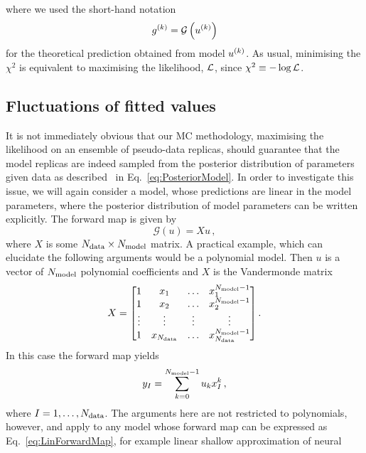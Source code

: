 where we used the short-hand notation
\begin{equation}
    g^{(k)} = \mathcal{G}\left(u^{(k)}\right)
\end{equation}
for the theoretical prediction obtained from model $u^{(k)}$. As usual,
minimising the $\chi^2$ is equivalent to maximising the likelihood,
$\mathcal{L}$, since $\chi^2 \equiv -\log{\mathcal{L}}$.

\subsection{Fluctuations of fitted values}
\label{sec:fluct-fit-values}

It is not immediately obvious that our MC methodology, maximising the likelihood
on an ensemble of pseudo-data replicas, should guarantee that the model replicas
are indeed sampled from the posterior distribution of parameters given data as
described \eg\ in Eq.~\ref{eq:PosteriorModel}. In order to investigate this
issue, we will again consider a model, whose predictions are linear in the model
parameters, where the posterior distribution of model parameters can be written
explicitly. The forward map is given by
\begin{equation}\label{eq:LinForwardMap}
    \mathcal G(u) = X u\, ,
\end{equation}
where $X$ is some $N_{\rm data}\times N_{\rm model}$ matrix. A practical example, which can
elucidate the following arguments would be a polynomial model. Then $u$ is a
vector of $N_{\rm model}$ polynomial coefficients and $X$ is the Vandermonde matrix
\begin{equation}
    X =
    \begin{bmatrix}
        1  & x_1 & \ldots& x_1^{N_{\rm model}-1} \\ 
        1  & x_2 & \ldots& x_2^{N_{\rm model}-1} \\ 
        \vdots  & \vdots & \vdots& \vdots \\ 
        1  & x_{N_{\rm data}} & \ldots & x_{N_{\rm data}}^{N_{\rm model}-1} 
    \end{bmatrix}.
\end{equation}
In this case the forward map yields
\begin{equation}
    \label{eq:PolyMod}
    y_I = \sum_{k=0}^{N_{\rm model}-1} u_k x_I^k\, , 
\end{equation}
where $I=1,\ldots,N_{\rm data}$. The arguments here are not restricted to polynomials,
however, and apply to any model whose forward map can be expressed as
Eq.~\eqref{eq:LinForwardMap}, for example linear shallow approximation of neural
